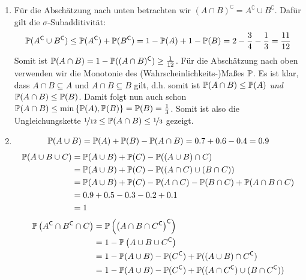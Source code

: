 \begin{exercisePage}
    \begin{enumerate}[leftmargin=*, label=(\alph*)]
        \item Für die Abschätzung nach unten betrachten wir $(A \cap B)^\complement = A^\complement \cup B^\complement$. Dafür gilt die $\sigma$-Subadditivität:
        \begin{equation*}
        \P(A^\complement \cup B^\complement) \leq \P(A^\complement) + \P(B^\complement) = 1 - \P(A) + 1 - \P(B) = 2 - \frac{3}{4} - \frac{1}{3} = \frac{11}{12}
        \end{equation*} 
        Somit ist $\P(A \cap B) = 1 - \P((A \cap B)^\complement) \geq \frac{1}{12}$. Für die Abschätzung nach oben verwenden wir die Monotonie des (Wahrscheinlichkeits-)Maßes $\P$. Es ist klar, dass $A \cap B \subseteq A$ und $A \cap B \subseteq B$ gilt, d.h. somit ist $\P(A \cap B) \leq \P(A)$ \textit{und} $\P(A \cap B) \leq \P(B)$. Damit folgt nun auch schon $\P(A \cap B) \leq \min \menge{\P(A) , \P(B)} = \P(B) = \frac{1}{3}$. Somit ist also die Ungleichungskette $\lfrac{1}{12} \leq \P(A \cap B) \leq \lfrac{1}{3}$ gezeigt.
        \item 
        \begin{align*}
            \P(A \cup B) = \P(A) + \P(B) - \P(A \cap B) = 0.7 + 0.6 - 0.4 = 0.9
        \end{align*}
        \begin{align*}
            \P(A \cup B \cup C) &= \P(A \cup B) + \P(C) - \P((A \cup  B) \cap C) \\
            &= \P(A \cup B) + \P(C) - \P((A \cap C) \cup  (B \cap C)) \\
            &= \P(A \cup B) + \P(C) - \P(A \cap C) - \P(B \cap C) + \P(A \cap B \cap C) \\
            &= 0.9 + 0.5 - 0.3 - 0.2 + 0.1 \\
            &= 1
        \end{align*}
        \begin{align*}
            \P \left( A^\complement \cap B^\complement \cap C \right)
            &= \P \left( \left( A \cap B \cap C^\complement \right)^\complement \right) \\
            &= 1 - \P \left( A \cup B \cup C^\complement \right) \\
            &= 1 - \P(A \cup B) - \P(C^\complement) + \P((A \cup B) \cap C^\complement) \\
            &= 1 - \P(A \cup B) - \P(C^\complement) + \P((A \cap C^\complement) \cup (B \cap C^\complement)) \\

\end{align*}
\end{enumerate}
\end{exercisePage}
